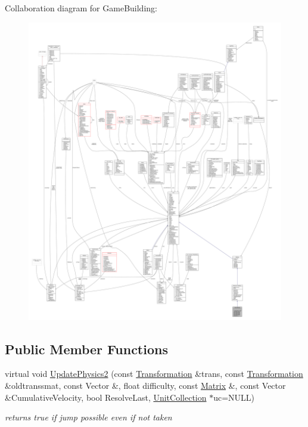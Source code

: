Collaboration diagram for Game\+Building\+:
\nopagebreak
\begin{figure}[H]
\begin{center}
\leavevmode
\includegraphics[width=350pt]{d6/da2/classGameBuilding__coll__graph}
\end{center}
\end{figure}
\subsection*{Public Member Functions}
\begin{DoxyCompactItemize}
\item 
virtual void \hyperlink{classGameBuilding_a41b1af4a3b09603e76b52cf7f7617482}{Update\+Physics2} (const \hyperlink{structTransformation}{Transformation} \&trans, const \hyperlink{structTransformation}{Transformation} \&oldtranssmat, const Vector \&, float difficulty, const \hyperlink{classMatrix}{Matrix} \&, const Vector \&Cumulative\+Velocity, bool Resolve\+Last, \hyperlink{classUnitCollection}{Unit\+Collection} $\ast$uc=N\+U\+LL)
\begin{DoxyCompactList}\small\item\em returns true if jump possible even if not taken \end{DoxyCompactList}\end{DoxyCompactItemize}
